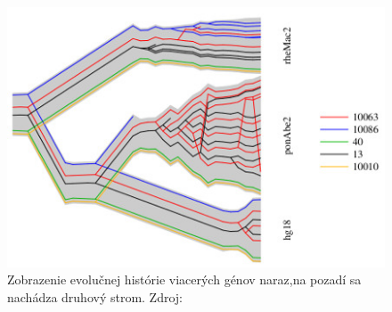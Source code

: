 \begin{figure}
\centerline{\includegraphics[width=1\textwidth]{images/DUP-tube-tree}}
\caption{Zobrazenie evolučnej histórie viacerých génov naraz,na pozadí sa nachádza druhový strom. Zdroj:\cite{Vinar2010}}\label{obr:tree}
\end{figure}
